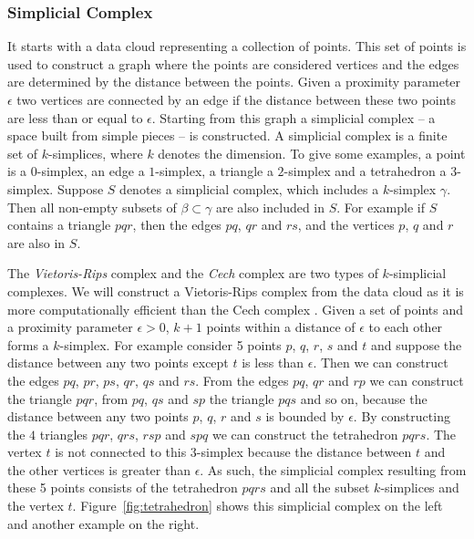\documentclass[letter,12pt]{article}
\begin{document}
\subsubsection{Simplicial Complex}\label{subsubsec:simplicialcomplex}
It starts with a data cloud  representing a collection of points. This set of points is used to construct a graph where the points are considered vertices and the edges are determined by the distance between the points. Given a proximity parameter $\epsilon$ two vertices are connected by an edge if the distance between these two points are less than or equal to $\epsilon$. Starting from this graph a simplicial complex -- a space built from simple pieces -- is constructed. A simplicial complex is a finite set of $k$-simplices, where $k$ denotes the dimension. To give some examples, a point is a $0$-simplex, an edge a $1$-simplex, a triangle a $2$-simplex and a tetrahedron a $3$-simplex. Suppose $S$ denotes a simplicial complex, which includes a $k$-simplex $\gamma$. Then all non-empty subsets of $\beta \subset \gamma$ are also included in $S$. For example if $S$ contains a triangle $pqr$, then the edges $pq$, $qr$ and $rs$, and the vertices $p$, $q$ and $r$ are also in $S$. 

The \textit{Vietoris-Rips} complex and the \textit{Cech} complex are two types of $k$-simplicial complexes. We will construct a Vietoris-Rips complex from the data cloud as it is more computationally efficient than the Cech complex \citep{ghrist2008barcodes}. Given a set of points and a proximity parameter $\epsilon > 0$, $k+1$ points within a distance of $\epsilon$ to each other forms a $k$-simplex.  For example consider 5 points $p$, $q$, $r$, $s$ and $t$ and suppose the distance between any two points except $t$ is less than $\epsilon$. Then we can construct the edges $pq$, $pr$, $ps$, $qr$, $qs$ and $rs$. From the edges $pq$, $qr$ and $rp$ we can construct the triangle $pqr$, from $pq$, $qs$ and $sp$ the triangle $pqs$ and so on, because the distance between any two points $p$, $q$, $r$ and $s$ is bounded by $\epsilon$. By constructing the $4$ triangles $pqr$, $qrs$, $rsp$ and $spq$ we can construct the tetrahedron $pqrs$. The vertex $t$ is not connected to this $3$-simplex because the distance between $t$ and the other vertices is greater than $\epsilon$. As such, the simplicial complex resulting from these 5 points consists of the tetrahedron $pqrs$ and all the subset $k$-simplices and the vertex $t$. Figure~\ref{fig:tetrahedron} shows this simplicial complex on the left and another example on the right. 
\end{document}
